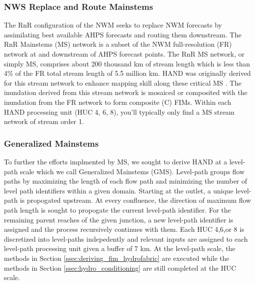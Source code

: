 \subsubsection{NWS Replace and Route Mainstems}
\label{sssec:replace_and_route_mainstems}
%
The RnR configuration of the NWM seeks to replace NWM forecasts by assimilating best available AHPS forecasts and routing them downstream.
The RnR Mainstems (MS) network is a subset of the NWM full-resolution (FR) network at and downstream of AHPS forecast points.
The RnR MS network, or simply MS, comprises about 200 thousand km of stream length which is less than 4\% of the FR total stream length of 5.5 million km.
HAND was originally derived for this stream network to enhance mapping skill along these critical MS \cite{djokic2019arc}. 
The inundation derived from this stream network is mosaiced or composited with the inundation from the FR network to form composite (C) FIMs. 
Within each HAND processing unit (HUC 4, 6, 8), you'll typically only find a MS stream network of stream order 1.
%
\subsubsection{Generalized Mainstems}
\label{sssec:generalized_mainstems}
%
To further the efforts implmented by MS, we sought to derive HAND at a level-path scale which we call Generalized Mainstems (GMS).
Level-path groups flow paths by maximizing the length of each flow path and minimizing the number of level path identifiers within a given domain. 
Starting at the outlet, a unique level-path is propogated upstream. 
At every confluence, the direction of maximum flow path length is sought to propogate the current level-path identifier.
For the remaining parent reaches of the given junction, a new level-path identifier is assigned and the process recursively continues with them.
Each HUC 4,6,or 8 is discretized into level-paths indepedently and relevant inputs are assigned to each level-path processing unit given a buffer of 7 km.
At the level-path scale, the methods in Section \ref{ssec:deriving_fim_hydrofabric} are executed while the methods in Section \ref{ssec:hydro_conditioning} are still completed at the HUC scale.
%

